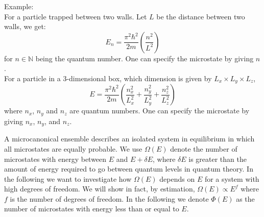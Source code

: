 \documentclass[11pt,oneside]{book}
\theoremstyle{break}
\theoremstyle{break}
\newcommand{\N}{\mathbb{N}}
\newcommand{\example}{\color{green}Example: \color{black}}
\begin{document}
\example\\
For a particle trapped between two walls. Let $L$ be the distance between two walls, we get: $$E_n = \frac{\pi^2 \hbar^2}{2m} \left(\frac{n^2}{L^2}\right)$$ for $n \in \N$ being the quantum number. One can specify the microstate by giving $n$. \\
For a particle in a $3$-dimensional box, which dimension is given by $L_x\times L_y\times L_z$, 
$$E = \frac{\pi^2 \hbar^2}{2m}\left(\frac{n_x^2}{L_x^2} + \frac{n_y^2}{L_y^2}+ \frac{n_z^2}{L_z^2}\right) $$
where $n_x$, $n_y$ and $n_z$ are quantum numbers. One can specify the microstate by giving $n_x$, $n_y$, and $n_z$. \\
\newpage

A microcanonical ensemble describes an isolated system in equilibrium in which all microstates are equally probable. We use $\Omega(E)$ denote the number of microstates with energy between $E$ and $E+\delta E$, where $\delta E$ is greater than the amount of energy required to go between quantum levels in quantum theory. In the following we want to investigate how $\Omega(E)$ depends on $E$ for a system with high degrees of freedom. We will show in fact, by estimation, $\Omega(E) \propto E^f$ where $f$ is the number of degrees of freedom. In the following we denote $\Phi(E)$ as the number of microstates with energy less than or equal to $E$.\\
\end{document}
